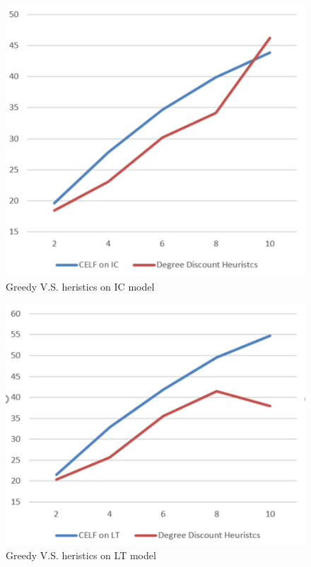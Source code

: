 \documentclass[journal,twoside,web]{ieeecolor}
\begin{document}
\begin{figure}[!t]
\centerline{\includegraphics[width=\columnwidth]{ic-spread.png}}
\caption{Greedy V.S. heristics on IC model}
\label{fig:icdiff}
\end{figure}

\begin{figure}[!t]
\centerline{\includegraphics[width=\columnwidth]{lt-spread.png}}
\caption{Greedy V.S. heristics on LT model}
\label{fig:ltdiff}
\end{figure}
\end{document}
